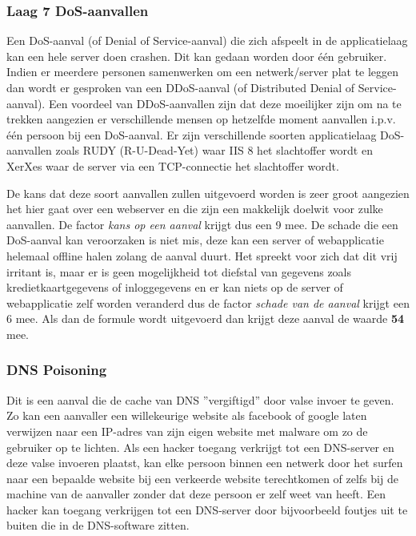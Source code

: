 \documentclass[pdftex,a4paper,12pt]{report}
\begin{document}
\subsubsection{Laag 7 DoS-aanvallen}
Een DoS-aanval (of Denial of Service-aanval) die zich afspeelt in de applicatielaag kan een hele server doen crashen. Dit kan gedaan worden door één gebruiker. Indien er meerdere personen samenwerken om een netwerk/server plat te leggen dan wordt er gesproken van een DDoS-aanval (of Distributed Denial of Service-aanval). Een voordeel van DDoS-aanvallen zijn dat deze moeilijker zijn om na te trekken aangezien er verschillende mensen op hetzelfde moment aanvallen i.p.v. één persoon bij een DoS-aanval. \citep{Blagov2014} Er zijn verschillende soorten applicatielaag DoS-aanvallen zoals RUDY (R-U-Dead-Yet) waar IIS 8 het slachtoffer wordt en XerXes waar de server via een TCP-connectie het slachtoffer wordt. \newline

De kans dat deze soort aanvallen zullen uitgevoerd worden is zeer groot aangezien het hier gaat over een webserver en die zijn een makkelijk doelwit voor zulke aanvallen. De factor \textit{kans op een aanval} krijgt dus een 9 mee. De schade die een DoS-aanval kan veroorzaken is niet mis, deze kan een server of webapplicatie helemaal offline halen zolang de aanval duurt. Het spreekt voor zich dat dit vrij irritant is, maar er is geen mogelijkheid tot diefstal van gegevens zoals kredietkaartgegevens of inloggegevens en er kan niets op de server of webapplicatie zelf worden veranderd dus de factor \textit{schade van de aanval} krijgt een 6 mee. Als dan de formule wordt uitgevoerd dan krijgt deze aanval de waarde \textbf{54} mee.

\subsubsection{DNS Poisoning}
Dit is een aanval die de cache van DNS ''vergiftigd'' door valse invoer te geven. Zo kan een aanvaller een willekeurige website als facebook of google laten verwijzen naar een IP-adres van zijn eigen website met malware om zo de gebruiker op te lichten. Als een hacker toegang verkrijgt tot een DNS-server en deze valse invoeren plaatst, kan elke persoon binnen een netwerk door het surfen naar een bepaalde website bij een verkeerde website terechtkomen of zelfs bij de machine van de aanvaller zonder dat deze persoon er zelf weet van heeft. Een hacker kan toegang verkrijgen tot een DNS-server door bijvoorbeeld foutjes uit te buiten die in de DNS-software zitten. \citep{Hoffm2015} \newline
\end{document}

